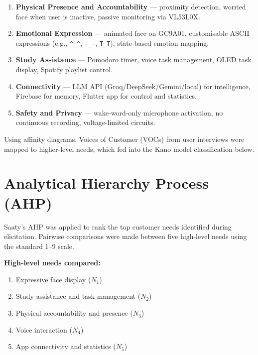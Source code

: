 \documentclass[12pt,a4paper]{article}
\begin{document}
\begin{enumerate}[leftmargin=*]
\item \textbf{Physical Presence and Accountability} --- proximity detection,
      worried face when user is inactive, passive monitoring via VL53L0X.
\item \textbf{Emotional Expression} --- animated face on GC9A01, customisable
      ASCII expressions (e.g., \texttt{\^{}\_\^{}}, \texttt{-\_-},
      \texttt{T\_T}), state-based emotion mapping.
\item \textbf{Study Assistance} --- Pomodoro timer, voice task management,
      OLED task display, Spotify playlist control.
\item \textbf{Connectivity} --- LLM API (Groq/DeepSeek/Gemini/local) for
      intelligence, Firebase for memory, Flutter app for control and
      statistics.
\item \textbf{Safety and Privacy} --- wake-word-only microphone activation,
      no continuous recording, voltage-limited circuits.
\end{enumerate}

Using affinity diagrams, Voices of Customer (VOCs) from user interviews were mapped
to higher-level needs, which fed into the Kano model classification below.

\newpage
\section*{Analytical Hierarchy Process (AHP)}

Saaty's AHP was applied to rank the top customer needs identified during elicitation.
Pairwise comparisons were made between five high-level needs using the standard
1--9 scale.

\textbf{High-level needs compared:}
\begin{enumerate}[leftmargin=*]
\item Expressive face display ($N_1$)
\item Study assistance and task management ($N_2$)
\item Physical accountability and presence ($N_3$)
\item Voice interaction ($N_4$)
\item App connectivity and statistics ($N_5$)
\end{enumerate}
\end{document}
